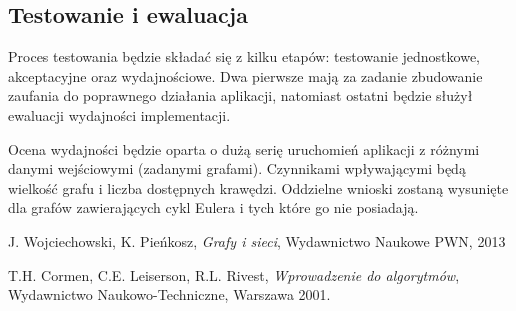 \documentclass[12pt,oneside,a4paper]{article}
\begin{document}
\subsection{Testowanie i ewaluacja}

Proces testowania będzie składać się z kilku etapów: testowanie jednostkowe, akceptacyjne oraz wydajnościowe. 
Dwa pierwsze mają za zadanie zbudowanie zaufania do poprawnego działania aplikacji, natomiast ostatni będzie służył ewaluacji wydajności implementacji. 

Ocena wydajności będzie oparta o dużą serię uruchomień aplikacji z różnymi danymi wejściowymi (zadanymi grafami). 
Czynnikami wpływającymi będą wielkość grafu i liczba dostępnych krawędzi. 
Oddzielne wnioski zostaną wysunięte dla grafów zawierających cykl Eulera i tych które go nie posiadają. 

\begin{thebibliography}{9}

 J. Wojciechowski, K. Pieńkosz, \emph{Grafy i sieci}, Wydawnictwo Naukowe PWN, 2013

 T.H. Cormen, C.E. Leiserson, R.L. Rivest, \emph{Wprowadzenie do algorytmów}, Wydawnictwo
Naukowo-Techniczne, Warszawa 2001.

\end{thebibliography}
\end{document}
